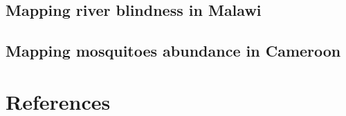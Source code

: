 \documentclass[
  letterpaper,
]{krantz}
\begin{document}
\hypertarget{mapping-river-blindness-in-malawi}{%
\section{Mapping river blindness in
Malawi}\label{mapping-river-blindness-in-malawi}}

\hypertarget{mapping-mosquitoes-abundance-in-cameroon}{%
\section{Mapping mosquitoes abundance in
Cameroon}\label{mapping-mosquitoes-abundance-in-cameroon}}


\hypertarget{references}{%
\chapter*{References}\label{references}}

\end{document}
